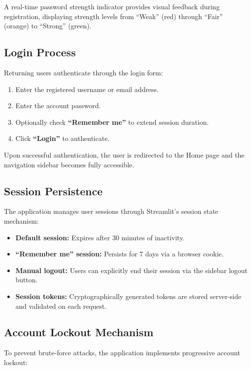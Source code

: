 \noindent A real-time password strength indicator provides visual feedback during registration, displaying strength levels from ``Weak'' (red) through ``Fair'' (orange) to ``Strong'' (green).

\subsection{Login Process}

Returning users authenticate through the login form:

\begin{enumerate}
    \item Enter the registered username or email address.
    \item Enter the account password.
    \item Optionally check \textbf{``Remember me''} to extend session duration.
    \item Click \textbf{``Login''} to authenticate.
\end{enumerate}

\noindent Upon successful authentication, the user is redirected to the Home page and the navigation sidebar becomes fully accessible.

\subsection{Session Persistence}

The application manages user sessions through Streamlit's session state mechanism:

\begin{itemize}
    \item \textbf{Default session:} Expires after 30 minutes of inactivity.
    \item \textbf{``Remember me'' session:} Persists for 7 days via a browser cookie.
    \item \textbf{Manual logout:} Users can explicitly end their session via the sidebar logout button.
    \item \textbf{Session tokens:} Cryptographically generated tokens are stored server-side and validated on each request.
\end{itemize}

\subsection{Account Lockout Mechanism}

To prevent brute-force attacks, the application implements progressive account lockout:

